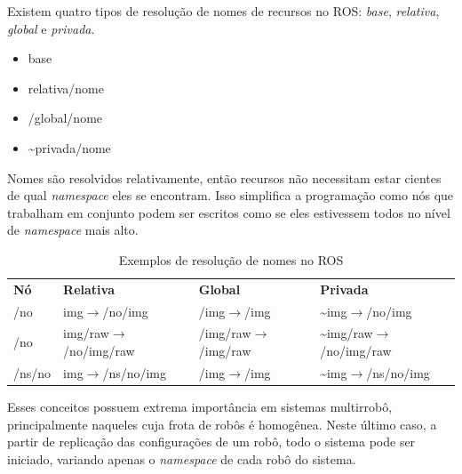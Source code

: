                Existem quatro tipos de resolução de nomes de recursos no ROS: \textit{base}, \textit{relativa}, \textit{global} e \textit{privada}.
                
                \begin{itemize}
                    \item base
                    
                    \item relativa/nome
                    
                    \item /global/nome
                    
                    \item \textasciitilde privada/nome
                \end{itemize}
                
                Nomes são resolvidos relativamente, então recursos não necessitam estar cientes de qual \textit{namespace} eles se encontram. Isso simplifica a programação como nós que trabalham em conjunto podem ser escritos como se eles estivessem todos no nível de \textit{namespace} mais alto.
                
                \begin{table}[hbt]
                    \centering
                    \caption{Exemplos de resolução de nomes no ROS}
                    \label{tab:ros_nomes}
                    \begin{tabular}{llll}
                        \textbf{Nó} & \textbf{Relativa} &  \textbf{Global} & \textbf{Privada} \\
                        /no & img$\to$/no/img & /img$\to$/img & \textasciitilde img$\to$/no/img \\
                        /no & img/raw$\to$/no/img/raw & /img/raw$\to$/img/raw & \textasciitilde img/raw$\to$/no/img/raw \\
                        /ns/no & img$\to$/ns/no/img & /img$\to$/img & \textasciitilde img$\to$/ns/no/img
                    \end{tabular}
                \end{table}
                
                Esses conceitos possuem extrema importância em sistemas multirrobô, principalmente naqueles cuja frota de robôs é homogênea. Neste último caso, a partir de replicação das configurações de um robô, todo o sistema pode ser iniciado, variando apenas o \textit{namespace} de cada robô do sistema.
            
